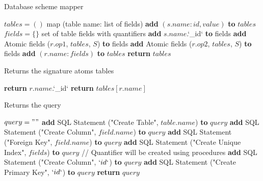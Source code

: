 \documentclass[oneside]{book}
\begin{document}
\begin{algorithm}
\caption{Database scheme mapper}
\label{array-sum0}
\begin{algorithmic}[1]
	\State $tables = ()$ \Comment map (table name: list of fields)
		\State \textbf{add} $(s.name: {id, value})$ \textbf{to} $tables$
			\State $fields = \{\}$ \Comment set of table fields with quantifiers
			\State \textbf{add} $s.name$.`\_id` \textbf{to} fields
			\State \textbf{add} Atomic fields ($r.op1$, $tables$, $S$) \textbf{to} fields
				\State \textbf{add} Atomic fields ($r.op2$, $tables$, $S$) \textbf{to} fields
			\EndIf
			\State \textbf{add} $(r.name: fields)$ \textbf{to} $tables$
		\EndFor
	\EndFor
	\State \textbf{return} $tables$
\EndFunction
\end{algorithmic}
\end{algorithm}

\begin{algorithm}
\caption{Returns the signature atoms tables}
\label{array-sum1}
\begin{algorithmic}[1]
				\State \textbf{return} $r.name$.`\_id`
			\EndIf
			\State \textbf{return} $tables[r.name]$
\EndFunction
\end{algorithmic}
\end{algorithm}

\begin{algorithm}
\caption{Returns the query}
\label{array-sum1}
\begin{algorithmic}[1]
	\State $query = ""$
		\State \textbf{add} SQL Statement ("Create Table", $table.name$) \textbf{to} $query$
			\State \textbf{add} SQL Statement ("Create Column", $field.name$) \textbf{to} $query$
			\State \textbf{add} SQL Statement ("Foreign Key", $field.name$) \textbf{to} $query$
			 \State \textbf{add} SQL Statement ("Create Unique Index", $fields$) \textbf{to} $query$
			\EndIf
			 \State // Quantifier will be created using procedures
			\EndIf
		\EndFor
		\State \textbf{add} SQL Statement ("Create Column", $`id`$) \textbf{to} $query$
		\State \textbf{add} SQL Statement ("Create Primary Key", $`id`$) \textbf{to} $query$
	\EndFor
			\State \textbf{return} $query$
\EndFunction
\end{algorithmic}
\end{algorithm}
\end{document}
